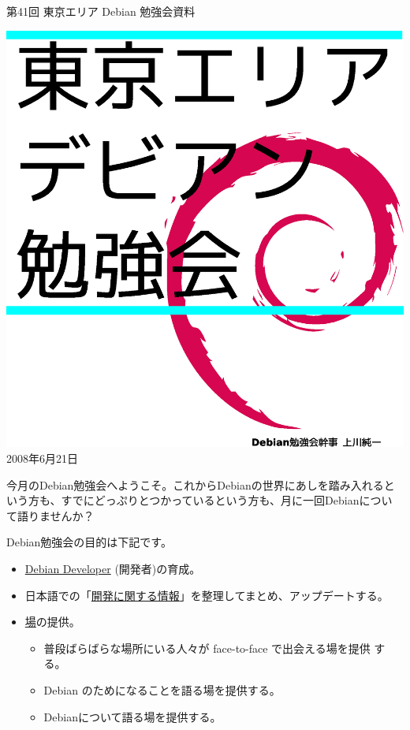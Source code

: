 \documentclass[mingoth,a4paper]{jsarticle}
\newcommand{\debmtgyear}{2008}
\newcommand{\debmtgmonth}{6}
\newcommand{\debmtgdate}{21}
\newcommand{\debmtgnumber}{41}
\begin{document}
\begin{titlepage}
\thispagestyle{empty}


\vspace*{-2cm}
第\debmtgnumber{}回 東京エリア Debian 勉強会資料

\hspace*{-2.4cm}
\includegraphics[width=210mm]{image200801/2008title.eps}\\
\hfill{}\debmtgyear{}年\debmtgmonth{}月\debmtgdate{}日

\end{titlepage}

 
 今月のDebian勉強会へようこそ。これからDebianの世界にあしを踏み入れると
 いう方も、すでにどっぷりとつかっているという方も、月に一回Debianについ
 て語りませんか？

 Debian勉強会の目的は下記です。

\begin{itemize}
 \item \underline{Debian Developer} (開発者)の育成。
 \item 日本語での「\underline{開発に関する情報}」を整理してまとめ、アップデートする。
 \item \underline{場}の提供。
 \begin{itemize}
  \item 普段ばらばらな場所にいる人々が face-to-face で出会える場を提供
	する。
  \item Debian のためになることを語る場を提供する。
  \item Debianについて語る場を提供する。
 \end{itemize}
\end{itemize}		
\end{document}
